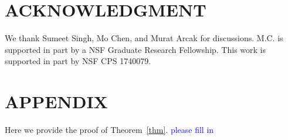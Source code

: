 \documentclass[letterpaper, 10 pt, conference]{ieeeconf}  %
\begin{document}
\section*{ACKNOWLEDGMENT}
We thank Sumeet Singh, Mo Chen, and Murat Arcak for discussions.
M.C. is supported in part by a NSF Graduate Research Fellowship.
This work is supported in part by NSF CPS 1740079.

\section*{APPENDIX}\label{appendix}
Here we provide the proof of Theorem~\ref{thm}. \textcolor{blue}{please fill in}

\addtolength{\textheight}{-2cm}   %


\end{document}
